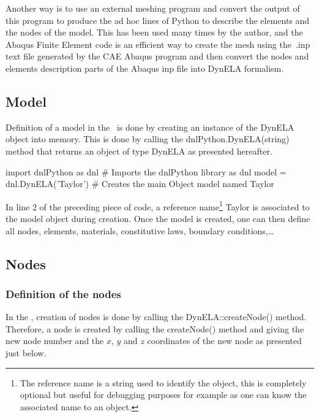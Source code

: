 Another way is to use an external meshing program and convert the output of this program to produce the ad hoc lines of Python to describe the elements and the nodes of the model. This has been used many times by the author, and the Abaqus Finite Element code is an efficient way to create the mesh using the \textsf{.inp} text file generated by the CAE Abaqus program and then convert the nodes and elements description parts of the Abaqus inp file into DynELA formalism.

\subsection{Model}

Definition of a model in the \DynELA~is done by creating an instance of the \textsf{DynELA} object into memory. This is done by calling the \textsf{dnlPython.DynELA(string)} method that returns an object of type \textsf{DynELA} as presented hereafter.

\begin{PythonListing}
import dnlPython as dnl       # Imports the dnlPython library as dnl
model = dnl.DynELA('Taylor')  # Creates the main Object model named Taylor
\end{PythonListing}

In line 2 of the preceding piece of code, a reference name\footnote{The reference name is a string used to identify the object, this is completely optional but useful for debugging purposes for example as one can know the associated name to an object.} \textsf{Taylor} is associated to the \textsf{model} object during creation. Once the model is created, one can then define all nodes, elements, materials, constitutive laws, boundary conditions,\ldots

\subsection{Nodes}

\subsubsection{Definition of the nodes}

In the \DynELA, creation of nodes is done by calling the \textsf{DynELA::createNode()} method. Therefore, a node is created by calling the \textsf{createNode()} method and giving the new node number and the $x$, $y$ and $z$ coordinates of the new node as presented just below.

